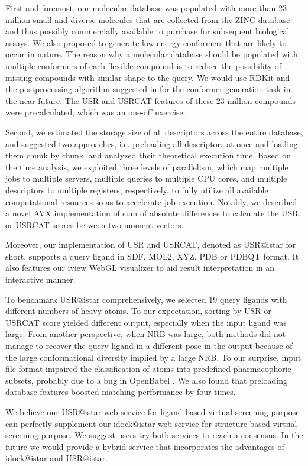 First and foremost, our molecular database was populated with more than 23 million small and diverse molecules that are collected from the ZINC database \citep{532,1178} and thus possibly commercially available to purchase for subsequent biological assays. We also proposed to generate low-energy conformers that are likely to occur in nature. The reason why a molecular database should be populated with multiple conformers of each flexible compound is to reduce the possibility of missing compounds with similar shape to the query. We would use RDKit and the postprocessing algorithm suggested in \citep{1127} for the conformer generation task in the near future. The USR and USRCAT features of these 23 million compounds were precalculated, which was an one-off exercise.

Second, we estimated the storage size of all descriptors across the entire database, and suggested two approaches, i.e. preloading all descriptors at once and loading them chunk by chunk, and analyzed their theoretical execution time. Based on the time analysis, we exploited three levels of parallelism, which map multiple jobs to multiple servers, multiple queries to multiple CPU cores, and multiple descriptors to multiple registers, respectively, to fully utilize all available computational resources so as to accelerate job execution. Notably, we described a novel AVX implementation of sum of absolute differences to calculate the USR or USRCAT scores between two moment vectors.

Moreover, our implementation of USR and USRCAT, denoted as USR@istar for short, supports a query ligand in SDF, MOL2, XYZ, PDB or PDBQT format. It also features our iview \citep{1366} WebGL visualizer to aid result interpretation in an interactive manner.

To benchmark USR@istar comprehensively, we selected 19 query ligands with different numbers of heavy atoms. To our expectation, sorting by USR or USRCAT score yielded different output, especially when the input ligand was large. From another perspective, when NRB was large, both methods did not manage to recover the query ligand in a different pose in the output because of the large conformational diversity implied by a large NRB. To our surprise, input file format impaired the classification of atoms into predefined pharmacophoric subsets, probably due to a bug in OpenBabel \citep{968}. We also found that preloading database features boosted matching performance by four times.

We believe our USR@istar web service for ligand-based virtual screening purpose can perfectly supplement our idock@istar web service for structure-based virtual screening purpose. We suggest users try both services to reach a consensus. In the future we would provide a hybrid service that incorporates the advantages of idock@istar and USR@istar.

